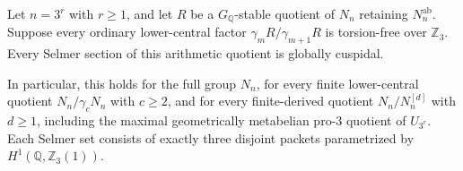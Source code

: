 \begin{theorem}
\label{thm:lm-power-all-derived}
Let $n=3^r$ with $r\ge1$, and let $R$ be a
$G_{\mathbb Q}$-stable quotient of $N_n$ retaining
$N_n^{\mathrm{ab}}$.  Suppose every ordinary lower-central
factor $\gamma_mR/\gamma_{m+1}R$ is torsion-free over
$\mathbb Z_3$.  Every Selmer section of this arithmetic
quotient is globally cuspidal.

In particular, this holds for the full group $N_n$,
for every finite lower-central quotient
$N_n/\gamma_cN_n$ with $c\ge2$, and for every finite-derived
quotient $N_n/N_n^{[d]}$ with $d\ge1$, including the maximal
geometrically metabelian pro-$3$ quotient of $U_{3^r}$.
Each Selmer set consists of exactly three disjoint
packets parametrized by $H^1(\mathbb Q,\mathbb Z_3(1))$.
\end{theorem}
